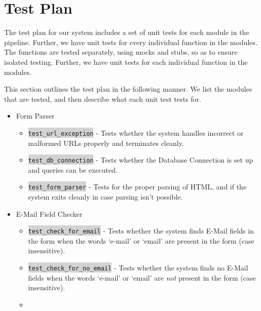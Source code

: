 \section{Test Plan}
\label{Arch:Test}
The test plan for our system includes a set of unit tests for each module in the pipeline. Further, we have unit tests for every %
 individual function in the modules. The functions are tested separately, using mocks and stubs, so as to ensure isolated testing. Further, we have unit tests for each individual function in the modules.

This section outlines the test plan in the following manner. We list the modules that are tested, and then describe what each unit test tests for.
\begin{itemize}
	\item Form Parser
	\begin{itemize}
		\item \colorbox{lightgray}{\lstinline{test_url_exception}} - Tests whether the system handles incorrect or malformed URLs properly and terminates cleanly.
		\item \colorbox{lightgray}{\lstinline{test_db_connection}} - Tests whether the Database Connection is set up and queries can be executed.
		\item \colorbox{lightgray}{\lstinline{test_form_parser}} - Tests for the proper parsing of HTML, and if the system exits cleanly in case parsing isn't possible.
	\end{itemize}

	\item E-Mail Field Checker
	\begin{itemize}
		\item \colorbox{lightgray}{\lstinline{test_check_for_email}} - Tests whether the system finds E-Mail fields in the form when the words `e-mail' or `email' are present in the form (case insensitive).
	
		\item \colorbox{lightgray}{\lstinline{test_check_for_no_email}} - Tests whether the system finds no E-Mail fields when the words `e-mail' or `email' are \emph{not} present in the form (case insensitive).
		\item
	\end{itemize}
	

\end{itemize}
